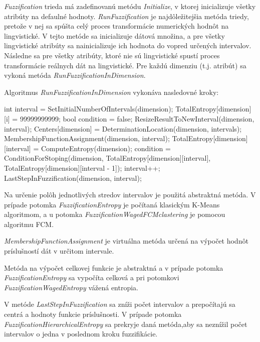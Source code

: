 \textit{Fuzzification} trieda má zadefinovanú metódu \textit{Initialize}, v ktorej inicializuje všetky atribúty na defaulné hodnoty. \textit{RunFuzzification} je najdôležitejšia metóda triedy, pretože v nej sa spúšta celý proces transformácie numerických hodnôt na lingvistické. V tejto metóde sa inicializuje dátová množina, a pre všetky lingvistické atribúty sa nainicializuje ich hodnota do vopred určených intervalov. Následne sa pre všetky atribúty, ktoré nie sú lingvistické spustí proces transformácie reálnych dát na lingvistické. Pre každú dimenziu (t.j. atribút) sa vykoná metóda \textit{RunFuzzificationInDimension}. 
\begin{algorithm}[ht!]
\caption{Algoritmus \textit{RunFuzzificationInDimension} vykonáva nasledovné kroky:}
\label{runFuzzification}
\begin{algorithmic}
\STATE int interval = SetInitialNumberOfIntervals(dimension);
\STATE TotalEntropy[dimension][i] = 99999999999;
\STATE bool condition = false;
\STATE ResizeResultToNewInterval(dimension, interval);
\STATE Centers[dimension] = DeterminationLocation(dimension, intervals);
\STATE MembershipFunctionAssignment(dimension, interval);
\STATE TotalEntropy[dimension][interval] = ComputeEntropy(dimension);
\STATE condition = ConditionForStoping(dimension,  TotalEntropy[dimension][interval], TotalEntropy[dimension][interval - 1]);  
\STATE  interval++;
\ENDWHILE
\STATE LastStepInFuzzification(dimension, interval);
\end{algorithmic}
\end{algorithm}

Na určenie polôh jednotlivých stredov intervalov je použitá abstraktná metóda. V prípade potomka \textit{FuzzificationEntropy} je počítaná klasickým K-Means algoritmom, a u potomka \textit{FuzzificationWagedFCMclastering} je pomocou algoritmu FCM. 

\textit{MembershipFunctionAssignment} je virtuálna metóda určená na výpočet hodnôt príslušností dát v určitom intervale.
 
Metóda na výpočet celkovej funkcie je abstraktná a v prípade potomka \textit{FuzzificationEntropy} sa vypočíta celková a pri potomkovi \textit{FuzzificationWagedEntropy} vážená entropia. 

V metóde \textit{LastStepInFuzzification} sa zníži počet intervalov a prepočítajú sa centrá a hodnoty funkcie príslušnosti. V prípade potomka \textit{FuzzificationHierarchicalEntropy} sa prekryje daná metóda,aby sa neznížil počet intervalov o jedna v poslednom kroku fuzzifikácie. 

